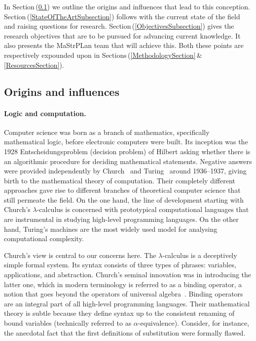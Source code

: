 \documentclass[11pt,twocolumn]{article}
\newcommand{\erc}{{\small\sf MaStrPLan}}
\newcommand{\pref}[1]{\,(\ref{#1})}
\newcommand{\lcalculus}{\mbox{$\lambda$-calculus}}
\begin{document}
In Section\pref{Origins} we outline the origins and influences that lead
to this conception. %
Section\pref{StateOfTheArtSubsection} follows with the current state of the
field and raising questions for research.  %
Section\pref{ObjectivesSubsection} gives the research objectives that are to
be pursued for advancing current knowledge. %
It also presents the {\erc} team that will achieve this.  Both these points
are respectively expounded upon in
Sections\,(\ref{MethodologySection}\,\&\,\ref{ResourcesSection}).

\subsection{Origins and influences}
\label{Origins}

\paragraph{Logic and computation.}

Computer science was born as a branch of mathematics, specifically
mathematical logic, before electronic computers were built.  Its inception
was the 1928 Entscheidungsproblem (decision problem) of Hilbert %
asking whether there is an algorithmic procedure for deciding mathematical
statements.  Negative answers were provided independently by
Church~\cite{Church1936} and Turing~\cite{Turing} around 1936--1937,
giving birth to the mathematical theory of computation.  Their completely
different approaches gave rise to different branches of theoretical
computer science that still permeate the field.  On the one hand, the line
of development starting with Church's {\lcalculus} %
is concerned with prototypical computational languages that are
instrumental in studying high-level programming languages.  On the other
hand, Turing's machines %
are the most widely used model for analysing computational complexity.

Church's view is central to our concerns here.  The {\lcalculus} is a
deceptively simple formal system.  Its syntax consists of three types of
phrases: variables, applications, and abstraction.  Church's seminal
innovation was in introducing the latter one, 
which in modern terminology is referred to as a binding operator, a notion
that goes beyond the operators of universal algebra~\cite{Birkhoff}.
Binding operators are an integral part of all high-level  programming
languages.  Their mathematical theory is subtle %
because they define syntax up to the consistent renaming of bound
variables (technically referred to as \mbox{$\alpha$-equivalence}).
Consider, for instance, the anecdotal fact that the first definitions of
substitution were formally flawed.  
\end{document}
